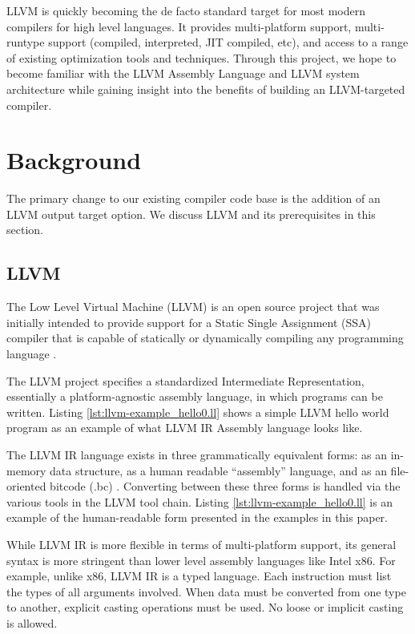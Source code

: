 \documentclass[11pt,twocolumn]{article}
\begin{document}
LLVM is quickly becoming the de facto standard target for most modern
compilers for high level languages.  It provides multi-platform
support, multi-runtype support (compiled, interpreted, JIT compiled,
etc), and access to a range of existing optimization tools and
techniques. Through this project, we hope to become familiar with the
LLVM Assembly Language and LLVM system architecture while gaining
insight into the benefits of building an LLVM-targeted compiler.

\section{Background}

The primary change to our existing compiler code base is the addition
of an LLVM output target option. We discuss LLVM and its prerequisites
in this section.

\subsection{LLVM}

The Low Level Virtual Machine (LLVM) is an open source project that
was initially intended to provide support for a Static Single
Assignment (SSA) compiler that is capable of statically or dynamically
compiling any programming language \cite{llvm.org}.

The LLVM project specifies a standardized Intermediate Representation,
essentially a platform-agnostic assembly language, in which programs
can be written. Listing \ref{lst:llvm-example_hello0.ll} shows
a simple LLVM hello world program as an example of
what LLVM IR Assembly language looks like.



The LLVM IR language exists in three grammatically equivalent forms:
as an in-memory data structure, as a human readable ``assembly''
language, and as an file-oriented bitcode (.bc) \cite{lattner-llvmlangref}.
Converting between these three forms is handled via the various tools
in the LLVM tool chain. Listing \ref{lst:llvm-example_hello0.ll} is an
example of the human-readable form presented in the examples in this paper.

While LLVM IR is more
flexible in terms of multi-platform support, its
general syntax is more stringent than lower level assembly languages
like Intel x86. For example, unlike x86, LLVM IR is a typed language.
Each instruction must list the types of all arguments involved. When
data must be converted from one type to another, explicit casting
operations must be used. No loose or implicit casting is allowed.
\end{document}
